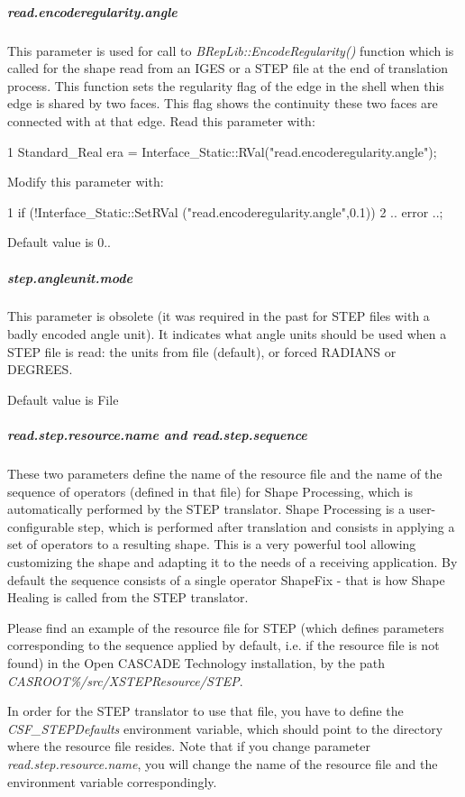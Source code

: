 \subparagraph*{read.\+encoderegularity.\+angle}

This parameter is used for call to {\itshape B\+Rep\+Lib\+::\+Encode\+Regularity()} function which is called for the shape read from an I\+G\+ES or a S\+T\+EP file at the end of translation process. This function sets the regularity flag of the edge in the shell when this edge is shared by two faces. This flag shows the continuity these two faces are connected with at that edge. Read this parameter with\+: 
\begin{DoxyCode}
1 Standard\_Real era =  Interface\_Static::RVal("read.encoderegularity.angle"); 
\end{DoxyCode}
 Modify this parameter with\+: 
\begin{DoxyCode}
1 if (!Interface\_Static::SetRVal ("read.encoderegularity.angle",0.1))  
2 .. error ..; 
\end{DoxyCode}
 Default value is 0..

\subparagraph*{step.\+angleunit.\+mode}

This parameter is obsolete (it was required in the past for S\+T\+EP files with a badly encoded angle unit). It indicates what angle units should be used when a S\+T\+EP file is read\+: the units from file (default), or forced R\+A\+D\+I\+A\+NS or D\+E\+G\+R\+E\+ES.

Default value is File

\subparagraph*{read.\+step.\+resource.\+name and read.\+step.\+sequence}

These two parameters define the name of the resource file and the name of the sequence of operators (defined in that file) for Shape Processing, which is automatically performed by the S\+T\+EP translator. Shape Processing is a user-\/configurable step, which is performed after translation and consists in applying a set of operators to a resulting shape. This is a very powerful tool allowing customizing the shape and adapting it to the needs of a receiving application. By default the sequence consists of a single operator Shape\+Fix -\/ that is how Shape Healing is called from the S\+T\+EP translator.

Please find an example of the resource file for S\+T\+EP (which defines parameters corresponding to the sequence applied by default, i.\+e. if the resource file is not found) in the Open C\+A\+S\+C\+A\+DE Technology installation, by the path {\itshape C\+A\+S\+R\+O\+OT\%/src/\+X\+S\+T\+E\+P\+Resource/\+S\+T\+EP}.

In order for the S\+T\+EP translator to use that file, you have to define the {\itshape C\+S\+F\+\_\+\+S\+T\+E\+P\+Defaults} environment variable, which should point to the directory where the resource file resides. Note that if you change parameter {\itshape read.\+step.\+resource.\+name}, you will change the name of the resource file and the environment variable correspondingly.

